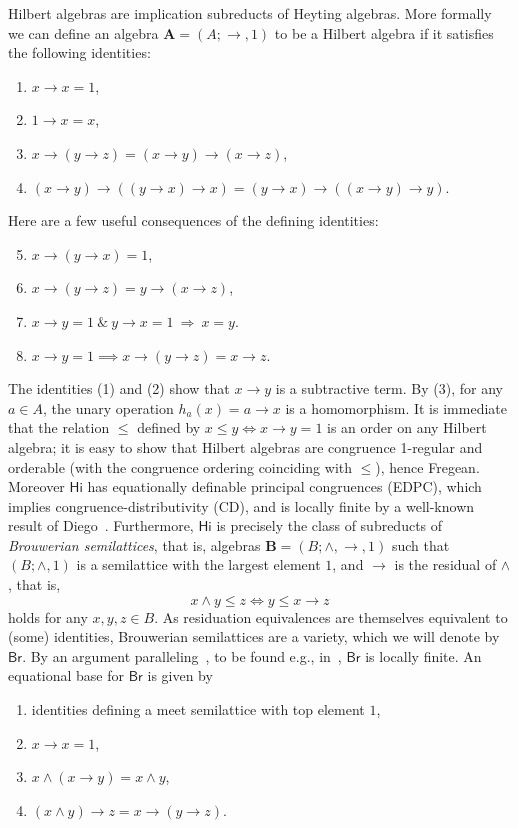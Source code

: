 \documentclass{amsart}
\newcommand{\alg}[1]{\mathbf{#1}}
\newcommand{\var}[1]{\mathsf{#1}}
\def\Ra{\Rightarrow}
\def\ra{\rightarrow}
\begin{document}
Hilbert algebras are implication subreducts of Heyting algebras. More
formally we can define an algebra $\alg{A} = (A; \ra,1)$ to be a Hilbert
algebra if it satisfies the following identities:
\begin{enumerate}[label={(H\arabic*)}]
\item $x\ra x = 1$,
\item $1\ra x = x$,
\item $x\ra (y\ra z) = (x\ra y)\ra(x\ra z)$,    
\item $(x\ra y)\ra ((y\ra x)\ra x) = (y\ra x)\ra ((x\ra y)\ra y)$.
\end{enumerate}
Here are a few useful consequences of the defining identities:
\begin{enumerate}[label={(H\arabic*)}]
\setcounter{enumi}{4}  
\item $x\ra (y\ra x) = 1$,  
\item $x\ra (y\ra z) = y\ra (x\ra z)$,
\item $x\ra y = 1 \ \mathbin{\&}\  y\ra x = 1 \ \Ra\  x = y$.
\item $x\ra y = 1 \implies x\ra(y\ra z) = x\ra z$.
\end{enumerate}
The identities (1) and (2) show that $x\ra y$ is a subtractive term.
By (3), for any $a\in A$, the unary
operation $h_a(x) = a\ra x$ is a homomorphism. 
It is immediate that the relation $\leq$ defined by
$x\leq y \iff x\ra y = 1$ is an order on any Hilbert algebra; it is easy to
show that Hilbert algebras are congruence 1-regular and orderable
(with the congruence ordering coinciding with $\leq$), hence Fregean.
Moreover $\var{Hi}$ has equationally definable principal congruences
(EDPC), which implies congruence-distributivity (CD), and is locally finite
by a well-known result of Diego~\cite{Die66}. 
Furthermore, $\var{Hi}$ is precisely the class of subreducts
of \emph{Brouwerian semilattices}, that is, algebras
$\alg{B} = (B;\wedge,\ra,1)$ such that $(B;\wedge,1)$ is a semilattice with
the largest element $1$, and $\ra$ is the residual of $\wedge$, that is,
$$
x\wedge y\leq z \iff y\leq x\ra z
$$
holds for any $x,y,z\in B$. As residuation equivalences are themselves equivalent
to (some) identities, Brouwerian semilattices are a variety, which we will
denote by $\var{Br}$. By an argument paralleling~\cite{Die66}, to be found e.g.,
in~\cite{Koh81}, $\var{Br}$ is locally finite. An equational base for $\var{Br}$
is given by   
\begin{enumerate}[label={(B\arabic*)}]
\item identities defining a meet semilattice with top element $1$,  
\item $x\ra x = 1$, 
\item $x\wedge(x\ra y) = x\wedge y$,
\item $(x\wedge y)\ra z = x\ra(y\ra z)$.
\end{enumerate}
\end{document}
